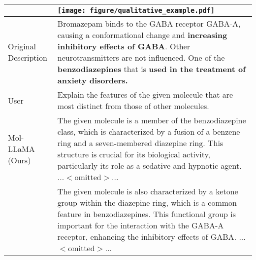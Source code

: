 
\begin{table*}[ht!]
\centering
\footnotesize
\renewcommand{\arraystretch}{1.2}
\begin{tabular}{p{2.15cm} p{14.05cm}}
\toprule
 & \texttt{[image: figure/qualitative\_example.pdf]}\\
\midrule
Original \phantom{00000} Description & Bromazepam binds to the GABA receptor GABA-A, causing a conformational change and \textbf{increasing inhibitory effects of GABA}. Other neurotransmitters are not influenced. One of the \textbf{benzodiazepines} that is \textbf{used in the treatment of anxiety disorders.} \\
\midrule
User & Explain the features of the given molecule that are most distinct from those of other molecules. \\
\midrule
Mol-LLaMA (Ours) & The given molecule is a member of the \textcolor{tabblue}{benzodiazepine class}, which is characterized by a fusion of a benzene ring and a seven-membered diazepine ring. This structure is crucial for its biological activity, particularly its role as \textcolor{tabblue}{a sedative and hypnotic agent}. ...$<$omitted$>$...\\

& The given molecule is also characterized by a ketone group within the diazepine ring, which is a common feature in benzodiazepines. \textcolor{tabblue}{This functional group is important for the interaction with the GABA-A receptor, enhancing the inhibitory effects of GABA}. ...$<$omitted$>$...\\


\end{tabular}
\end{table*}
